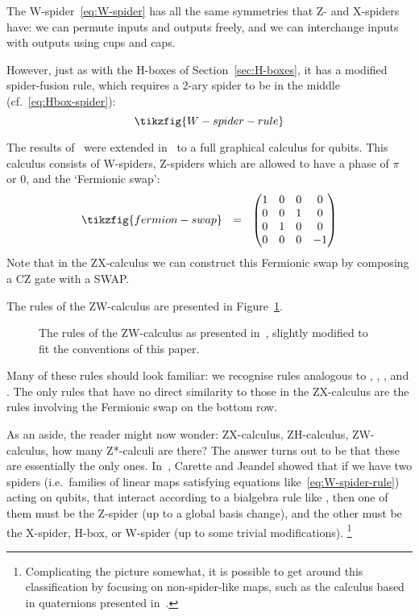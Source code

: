 \documentclass[a4paper,onecolumn,superscriptaddress,11pt,%
				unpublished,%
				allowfontchageintitle,%
				]{quantumarticle}
\begin{document}
The W-spider~\eqref{eq:W-spider} has all the same symmetries that Z- and X-spiders have: we can permute inputs and outputs freely, and we can interchange inputs with outputs using cups and caps.

However, just as with the H-boxes of Section~\ref{sec:H-boxes}, it has a modified spider-fusion rule, which requires a 2-ary spider to be in the middle (cf.~\eqref{eq:Hbox-spider}):
\begin{equation}\label{eq:W-spider-rule}
	\tikzfig{W-spider-rule}
\end{equation}

The results of~\cite{CoeckeKissinger2010compositional} were extended in~\cite{hadzihasanovic2015diagrammatic} to a full graphical calculus for qubits. This calculus consists of W-spiders, Z-spiders which are allowed to have a phase of $\pi$ or $0$, and the `Fermionic swap':
\begin{equation}
	\tikzfig{fermion-swap} \ \ = \ \ 
	\begin{pmatrix}
	1&0&0&0\\
	0&0&1&0\\
	0&1&0&0\\
	0&0&0&-1
	\end{pmatrix}
\end{equation}
Note that in the ZX-calculus we can construct this Fermionic swap by composing a CZ gate with a SWAP.

The rules of the ZW-calculus are presented in Figure~\ref{fig:zw-rules}.
\begin{figure}%
\centering
{}
\caption[Rules of the ZW-calculus]{
	The rules of the ZW-calculus as presented in~\cite{hadzihasanovic2015diagrammatic}, slightly modified to fit the conventions of this paper.
}
\label{fig:zw-rules}
\end{figure}

Many of these rules should look familiar: we recognise rules analogous to \SpiderRule, \CopyRule, \PiRule, \BialgRule and \HopfRule. The only rules that have no direct similarity to those in the ZX-calculus are the rules involving the Fermionic swap on the bottom row.

As an aside, the reader might now wonder: ZX-calculus, ZH-calculus, ZW-calculus, how many Z*-calculi are there? The answer turns out to be that these are essentially the only ones. In~\cite{carette2020recipe}, Carette and Jeandel showed that if we have two spiders (i.e.~families of linear maps satisfying equations like~\eqref{eq:W-spider-rule}) acting on qubits, that interact according to a bialgebra rule like \BialgRule, then one of them must be the Z-spider (up to a global basis change), and the other must be the X-spider, H-box, or W-spider (up to some trivial modifications).%
\footnote{Complicating the picture somewhat, it is possible to get around this classification by focusing on non-spider-like maps, such as the calculus based in quaternions presented in~\cite{MillerBakewell2020ZQ}.}
\end{document}
